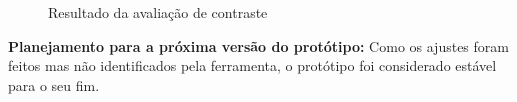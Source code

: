 \begin{figure}[h!]
  \centering
    \caption{Resultado da avaliação de contraste}
    \label{fig:contraste2}
\end{figure}



\textbf{Planejamento para a próxima versão do protótipo:}
Como os ajustes foram feitos mas não identificados pela ferramenta, o protótipo foi considerado estável para o seu fim.

\vfill
\pagebreak




